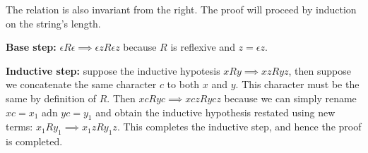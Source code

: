 \documentclass[11pt]{article}
\begin{document}
The relation is also invariant from the right.  The proof will proceed
by induction on the string's length.

\textbf{Base step:} \(\epsilon R \epsilon \implies \epsilon z R \epsilon z\) because
\(R\) is reflexive and \(z = \epsilon z\).

\textbf{Inductive step:} suppose the inductive hypotesis \(xRy \implies xzRyz\), then
suppose we concatenate the same character \(c\) to both \(x\) and \(y\).  This
character must be the same by definition of \(R\).  Then \(xcRyc \implies
    xczRycz\) because we can simply rename \(xc = x_1\) adn \(yc = y_1\) and obtain
the inductive hypothesis restated using new terms: \(x_1Ry_1 \implies
    x_1zRy_1z\).  This completes the inductive step, and hence the proof is
completed.
\end{document}
